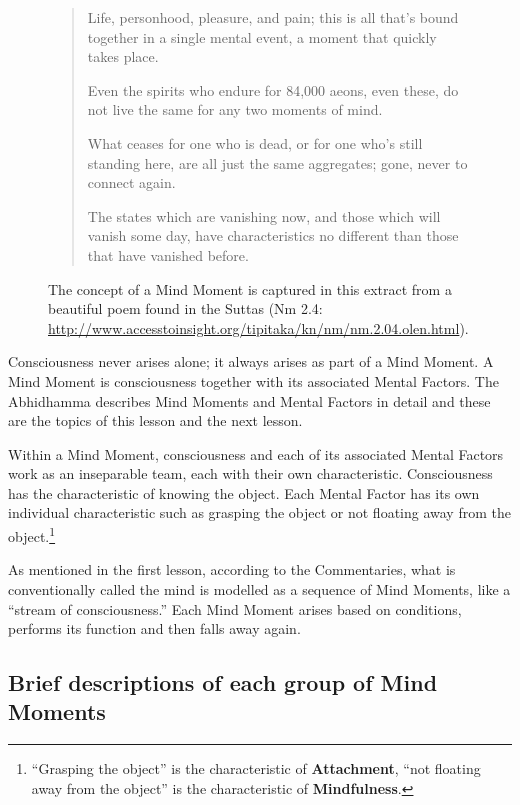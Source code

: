 \begin{figure} [H]

\vspace{-1mm}

\begin{quote}
Life, personhood, pleasure, and pain; this is all that's bound together in a single mental event, a moment that quickly takes place.

Even the spirits who endure for 84,000 aeons, even these, do not live the same for any two moments of mind.

What ceases for one who is dead, or for one who's still standing here, are all just the same aggregates; gone, never to connect again.

The states which are vanishing now, and those which will vanish some day, have characteristics no different than those that have vanished before.

\end{quote}

\caption{The concept of a Mind Moment is captured in this extract from a beautiful poem found in the Suttas (Nm 2.4: \url{http://www.accesstoinsight.org/tipitaka/kn/nm/nm.2.04.olen.html}).}

\end{figure}

Consciousness never arises alone; it always arises as part of a Mind Moment. A Mind Moment is consciousness together with its associated Mental Factors. The Abhidhamma describes Mind Moments and Mental Factors in detail and these are the topics of this lesson and the next lesson.

\pagebreak

Within a Mind Moment, consciousness and each of its associated Mental Factors work as an inseparable team, each with their own characteristic. Consciousness has the characteristic of knowing the object. Each Mental Factor has its own individual characteristic such as grasping the object or not floating away from the object.\footnote{“Grasping the object” is the characteristic of \textbf{Attachment}, “not floating away from the object” is the characteristic of \textbf{Mindfulness}.}

As mentioned in the first lesson, according to the Commentaries, what is conventionally called the mind is modelled as a sequence of Mind Moments, like a “stream of consciousness.” Each Mind Moment arises based on conditions, performs its function and then falls away again.

\subsection*{Brief descriptions of each group of Mind Moments}

